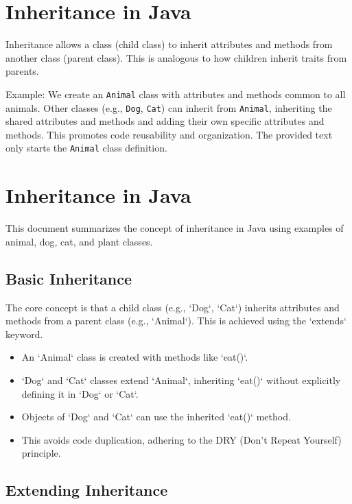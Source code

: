 \documentclass{article}
\begin{document}
\section{Inheritance in Java}

Inheritance allows a class (child class) to inherit attributes and methods from another class (parent class).  This is analogous to how children inherit traits from parents.

Example: We create an \texttt{Animal} class with attributes and methods common to all animals.  Other classes (e.g., \texttt{Dog}, \texttt{Cat}) can inherit from \texttt{Animal}, inheriting the shared attributes and methods and adding their own specific attributes and methods.  This promotes code reusability and organization.  The provided text only starts the \texttt{Animal} class definition.


\section{Inheritance in Java}

This document summarizes the concept of inheritance in Java using examples of animal, dog, cat, and plant classes.

\subsection{Basic Inheritance}

The core concept is that a child class (e.g., `Dog`, `Cat`) inherits attributes and methods from a parent class (e.g., `Animal`).  This is achieved using the `extends` keyword.

\begin{itemize}
    \item An `Animal` class is created with methods like `eat()`.
    \item `Dog` and `Cat` classes extend `Animal`, inheriting `eat()` without explicitly defining it in `Dog` or `Cat`.
    \item Objects of `Dog` and `Cat` can use the inherited `eat()` method.
    \item This avoids code duplication, adhering to the DRY (Don't Repeat Yourself) principle.
\end{itemize}

\subsection{Extending Inheritance}
\end{document}
